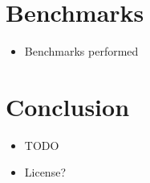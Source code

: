 \documentclass[oribibl]{llncs2e/llncs}
\begin{document}
\section{Benchmarks}
\begin{itemize}
\item Benchmarks performed
\end{itemize}


\section{Conclusion}
\begin{itemize}
\item TODO
\item License?
\end{itemize}

\end{document}
